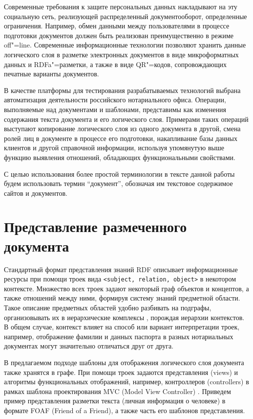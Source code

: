 \documentclass[utf8]{../IncArticle}
\begin{document}
Современные требования к защите персональных данных накладывают на эту
социальную сеть, реализующей распределенный документооборот,
определенные ограничения.  Например, обмен данными между
пользователями в процессе подготовки документов должен быть реализован
преимущественно в режиме off"=line.  Современные информационные
технологии позволяют хранить данные логического слоя в разметке
электронных документов в виде микроформатных данных и RDFa"=разметки,
а также в виде QR"=кодов, сопровождающих печатные варианты документов.

В качестве платформы для тестирования разрабатываемых технологий
выбрана автоматизация деятельности российского нотариального
офиса.  Операции, выполняемые над документами и шаблонами, представимы
как изменения содержания текста документа и его логического
слоя.  Примерами таких операций выступают копирование логического слоя
из одного документа в другой, смена ролей лиц в документе в процессе
его подготовки, накапливание базы данных клиентов и другой справочной
информации, используя упомянутую выше функцию выявления отношений,
обладающих функциональными свойствами.

С целью использования более простой терминологии в тексте данной
работы будем использовать термин ``документ'', обозначая им текстовое
содержимое сайтов и документов.

\section{Представление размеченного документа}

Стандартный формат представления знаний RDF описывает информационные
ресурсы при помощи троек вида \texttt{<subject, relation, object>} в
некотором контексте.  Множество всех троек задают некоторый граф
объектов и концептов, а также отношений между ними, формируя
систему знаний предметной области.  Такое описание предметных областей
удобно разбивать на подграфы, организовывать их в иерархические
комплексы \cite{b2:15}, порождая иерархии контекстов.  В общем случае,
контекст влияет на способ или вариант интерпретации троек, например,
отображение фамилии и данных паспорта в разных нотариальных документах
могут значительно отличаться друг от друга.

В предлагаемом подходе \cite{zont2013} шаблоны для отображения
логического слоя документа также хранятся в графе.  При помощи троек
задаются представления (views) и алгоритмы функциональных
отображений, например, контроллеров (controllers) в рамках шаблона
проектирования MVC (Model View Controller) \cite{b2:5}.  Приведем
пример представления разметки текста (личная информация о человеке) в
формате FOAF (Friend of a Friend), а также часть его шаблонов
представления.
\end{document}
